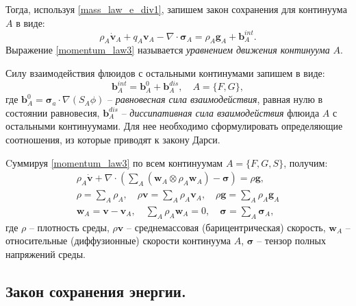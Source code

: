	Тогда, используя \eqref{mass_law_e_div1}, запишем закон сохранения для континуума $A$ в виде:
\begin{equation}
	\label{momentum_law3}
	\rho_A \dot{\boldsymbol{v}}_A + q_A \boldsymbol{v}_A - \nabla \cdot \boldsymbol{\sigma}_A = \rho_A\boldsymbol{g}_A + \boldsymbol{b}_A^{int}.
\end{equation}
	Выражение \eqref{momentum_law3} называется \textit{уравнением движения континуума} $A$.

	Силу взаимодействия флюидов с остальными континумами запишем в виде:
\begin{equation}
	\label{int_force}
	\boldsymbol{b}_A^{int} = \boldsymbol{b}_A^0 + \boldsymbol{b}_A^{dis}, \quad A = \{F, G\},
\end{equation}
	где $\boldsymbol{b}_A^0 = \boldsymbol{\sigma}_a \cdot \nabla (S_A\phi)$ -- \textit{равновесная сила взаимодействия}, равная нулю в состоянии равновесия, $\boldsymbol{b}_A^{dis}$ -- \textit{диссипативная сила взаимодействия} флюида $A$ с остальными континуумами. Для нее необходимо сформулировать определяющие соотношения, из которые приводят к закону Дарси.
	
	Cуммируя \eqref{momentum_law3} по всем континуумам $A = \{F, G, S\}$, получим:
\begin{align}
	\label{momentum_law_full}
	\rho_A \dot{\boldsymbol{v}} + \nabla \cdot \left(\sum\limits_{A}\left(\boldsymbol{w}_A \otimes \rho_A\boldsymbol{w}_A\right) -\boldsymbol{\sigma}\right) = \rho \boldsymbol{g},\\
	\rho = \sum\limits_{A} \rho_A, \quad \rho\boldsymbol{v}=\sum\limits_{A}\rho_A\boldsymbol{v}_A, \quad 
	\rho\boldsymbol{g}=\sum\limits_{A}\rho_A\boldsymbol{g}_A\\
	\boldsymbol{w}_A = \boldsymbol{v} - \boldsymbol{v}_A, \quad \sum\limits_A \rho_A\boldsymbol{w}_A = 0, \quad
	\boldsymbol{\sigma} = \sum\limits_{A} \boldsymbol{\sigma}_A,
\end{align}
	где $\rho$ -- плотность среды, $\rho\boldsymbol{v}$ -- среднемассовая (барицентрическая) скорость,
	$\boldsymbol{w}_A$ -- относительные (диффузионные) скорости континуума $A$,
	$\boldsymbol{\sigma}$ -- тензор полных напряжений среды.
	
\subsection{Закон сохранения энергии.}